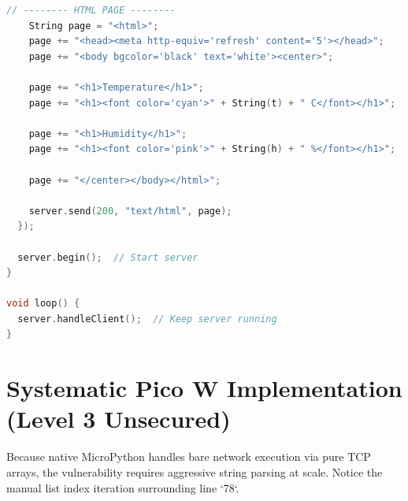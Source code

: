 \begin{lstlisting}[language=C++, caption=23022026\_Level\_6\_IoT\_Insecurity\_Demo\_With\_Description.ino]
    // -------- HTML PAGE --------
    String page = "<html>";
    page += "<head><meta http-equiv='refresh' content='5'></head>";
    page += "<body bgcolor='black' text='white'><center>";

    page += "<h1>Temperature</h1>";
    page += "<h1><font color='cyan'>" + String(t) + " C</font></h1>";

    page += "<h1>Humidity</h1>";
    page += "<h1><font color='pink'>" + String(h) + " %</font></h1>";

    page += "</center></body></html>";

    server.send(200, "text/html", page);
  });

  server.begin();  // Start server
}

void loop() {
  server.handleClient();  // Keep server running
}
\end{lstlisting}


\section{Systematic Pico W Implementation (Level 3 Unsecured)}

Because native MicroPython handles bare network execution via pure TCP arrays, the vulnerability requires aggressive string parsing at scale. Notice the manual list index iteration surrounding line `78`.

